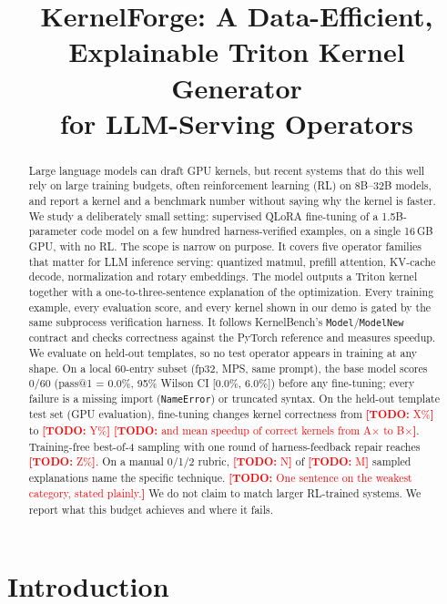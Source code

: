 \documentclass[11pt]{article}
\title{KernelForge: A Data-Efficient, Explainable Triton Kernel Generator\\for LLM-Serving Operators}
\author{\todo{author name, affiliation}}
\date{\todo{posting date}}
\newcommand{\todo}[1]{\textcolor{red}{\textbf{[TODO:} #1\textbf{]}}}
\newcommand{\code}[1]{\texttt{#1}}
\begin{document}
\maketitle

\begin{abstract}
Large language models can draft GPU kernels, but recent systems that do this well rely on
large training budgets, often reinforcement learning (RL) on 8B--32B models, and report a
kernel and a benchmark number without saying why the kernel is faster.
We study a deliberately small setting: supervised QLoRA fine-tuning of a
1.5B-parameter code model on a few hundred harness-verified examples, on a single 16\,GB
GPU, with no RL. The scope is narrow on purpose. It covers five operator families that matter
for LLM inference serving: quantized matmul, prefill attention, KV-cache decode, normalization
and rotary embeddings. The model outputs a Triton kernel together with a one-to-three-sentence
explanation of the optimization.
Every training example, every evaluation score, and every kernel shown in our demo is gated by
the same subprocess verification harness. It follows KernelBench's \code{Model}/\code{ModelNew}
contract and checks correctness against the PyTorch reference and measures speedup.
We evaluate on held-out templates, so no test operator appears in training at any shape.
On a local 60-entry subset (fp32, MPS, same prompt), the base model scores 0/60
(pass@1 = 0.0\%, 95\% Wilson CI [0.0\%, 6.0\%]) before any fine-tuning; every failure
is a missing import (\code{NameError}) or truncated syntax.
On the held-out template test set (GPU evaluation), fine-tuning changes kernel correctness
from \todo{X\%} to \todo{Y\%}
\todo{and mean speedup of correct kernels from A$\times$ to B$\times$}. Training-free best-of-4
sampling with one round of harness-feedback repair reaches \todo{Z\%}. On a manual 0/1/2
rubric, \todo{N} of \todo{M} sampled explanations name the specific technique.
\todo{One sentence on the weakest category, stated plainly.}
We do not claim to match larger RL-trained systems. We report what this budget achieves and
where it fails.
\end{abstract}

\section{Introduction}
\end{document}
